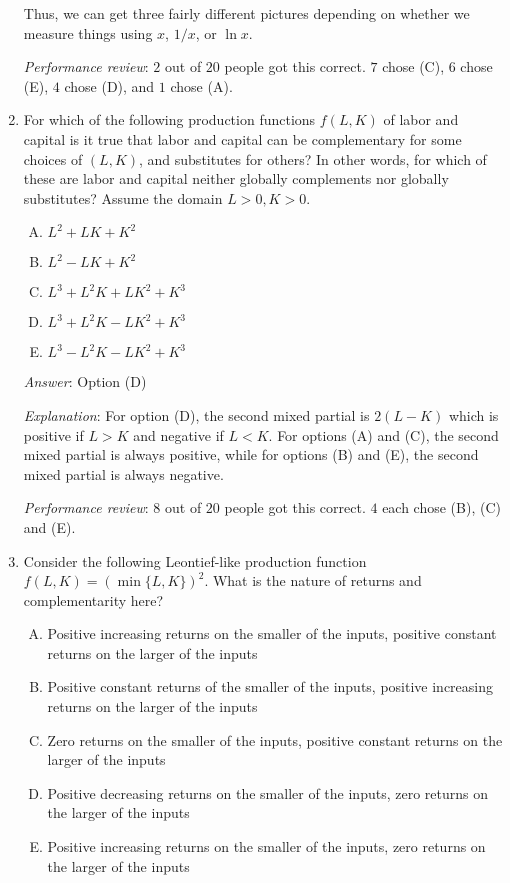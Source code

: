 \documentclass[10pt]{amsart}
\begin{document}
\begin{enumerate}
  Thus, we can get three fairly different pictures depending on
  whether we measure things using $x$, $1/x$, or $\ln x$.

  {\em Performance review}: $2$ out of $20$ people got this
  correct. $7$ chose (C), $6$ chose (E), $4$ chose (D), and $1$ chose
  (A).
\item For which of the following production functions $f(L,K)$ of
  labor and capital is it true that labor and capital can be
  complementary for some choices of $(L,K)$, and substitutes for
  others? In other words, for which of these are labor and capital
  neither globally complements nor globally substitutes? Assume the
  domain $L > 0, K > 0$.

  \begin{enumerate}[(A)]
  \item $L^2 + LK + K^2$
  \item $L^2 - LK + K^2$
  \item $L^3 + L^2K + LK^2 + K^3$
  \item $L^3 + L^2K - LK^2 + K^3$
  \item $L^3 - L^2K - LK^2 + K^3$
  \end{enumerate}

  {\em Answer}: Option (D)

  {\em Explanation}: For option (D), the second mixed partial is $2(L
  - K)$ which is positive if $L > K$ and negative if $L < K$. For
  options (A) and (C), the second mixed partial is always positive,
  while for options (B) and (E), the second mixed partial is always
  negative.

  {\em Performance review}: $8$ out of $20$ people got this
  correct. $4$ each chose (B), (C) and (E).
\item Consider the following Leontief-like production function $f(L,K)
  = (\min \{ L, K \})^2$. What is the nature of returns and
  complementarity here?

  \begin{enumerate}[(A)]
  \item Positive increasing returns on the smaller of the inputs,
    positive constant returns on the larger of the inputs
  \item Positive constant returns of the smaller of the inputs,
    positive increasing returns on the larger of the inputs
  \item Zero returns on the smaller of the inputs, positive constant
    returns on the larger of the inputs
  \item Positive decreasing returns on the smaller of the inputs, zero
    returns on the larger of the inputs
  \item Positive increasing returns on the smaller of the inputs, zero
    returns on the larger of the inputs
  \end{enumerate}


\end{enumerate}
\end{document}
